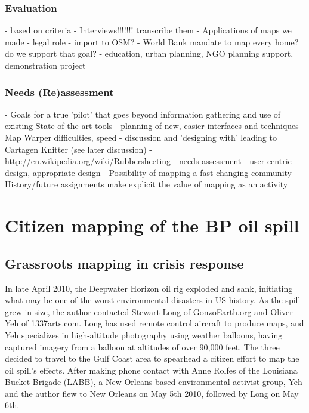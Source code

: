 \documentclass[11pt]{report}
\begin{document}
\subsection{Evaluation}
- based on criteria
        - Interviews!!!!!!! transcribe them
        - Applications of maps we made
            - legal role
            - import to OSM?
            - World Bank mandate to map every home? do we support that goal?
            - education, urban planning, NGO planning support, demonstration project
\subsection{Needs (Re)assessment}
- Goals for a true 'pilot' that goes beyond information gathering and use of existing State of the art tools
   - planning of new, easier interfaces and techniques
                - Map Warper difficulties, speed
            - discussion and 'designing with' leading to Cartagen Knitter (see later discussion)
		- http://en.wikipedia.org/wiki/Rubbersheeting
            - needs assessment - user-centric design, appropriate design
    - Possibility of mapping a fast-changing community
        History/future assignments make explicit the value of mapping as an activity

\chapter{Citizen mapping of the BP oil spill}
\section{Grassroots mapping in crisis response}

In late April 2010, the Deepwater Horizon oil rig exploded and sank, initiating what may be one of the worst environmental disasters in US history. As the spill grew in size, the author contacted Stewart Long of GonzoEarth.org and Oliver Yeh of 1337arts.com. Long has used remote control aircraft to produce maps, and Yeh specializes in high-altitude photography using weather balloons, having captured imagery from a balloon at altitudes of over 90,000 feet. The three decided to travel to the Gulf Coast area to spearhead a citizen effort to map the oil spill's effects. After making phone contact with Anne Rolfes of the Louisiana Bucket Brigade (LABB), a New Orleans-based environmental activist group, Yeh and the author flew to New Orleans on May 5th 2010, followed by Long on May 6th. 
\end{document}
